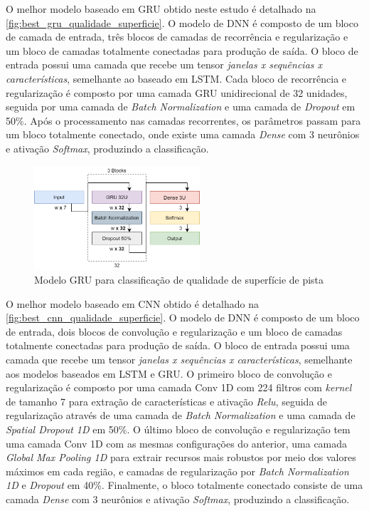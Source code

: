 O melhor modelo baseado em GRU obtido neste estudo é detalhado na \autoref{fig:best_gru_qualidade_superficie}. O modelo de DNN é composto de um bloco de camada de entrada, três blocos de camadas de recorrência e regularização e um bloco de camadas totalmente conectadas para produção de saída. O bloco de entrada possui uma camada que recebe um tensor \emph{janelas x sequências x características}, semelhante ao baseado em LSTM. Cada bloco de recorrência e regularização é composto por uma camada GRU unidirecional de 32 unidades, seguida por uma camada de \textit{Batch Normalization} e uma camada de \textit{Dropout} em 50\%. Após o processamento nas camadas recorrentes, os parâmetros passam para um bloco totalmente conectado, onde existe uma camada \textit{Dense} com 3 neurônios e ativação \textit{Softmax}, produzindo a classificação.

\begin{figure}[h!]
  \centering
  \caption{Modelo GRU para classificação de qualidade de superfície de pista}
  \label{fig:best_gru_qualidade_superficie}
  \includegraphics[width=0.55\textwidth]{figuras/fig_47.png}
\end{figure}

O melhor modelo baseado em CNN obtido é detalhado na \autoref{fig:best_cnn_qualidade_superficie}. O modelo de DNN é composto de um bloco de entrada, dois blocos de convolução e regularização e um bloco de camadas totalmente conectadas para produção de saída. O bloco de entrada possui uma camada que recebe um tensor \emph{janelas x sequências x características}, semelhante aos modelos baseados em LSTM e GRU. O primeiro bloco de convolução e regularização é composto por uma camada Conv 1D com 224 filtros com \textit{kernel} de tamanho 7 para extração de características e ativação \textit{Relu}, seguida de regularização através de uma camada de \textit{Batch Normalization} e uma camada de \textit{Spatial Dropout 1D} em 50\%. O último bloco de convolução e regularização tem uma camada Conv 1D com as mesmas configurações do anterior, uma camada \textit{Global Max Pooling 1D} para extrair recursos mais robustos por meio dos valores máximos em cada região, e camadas de regularização por \textit{Batch Normalization 1D} e \textit{Dropout} em 40\%. Finalmente, o bloco totalmente conectado consiste de uma camada \textit{Dense} com 3 neurônios e ativação \textit{Softmax}, produzindo a classificação.

